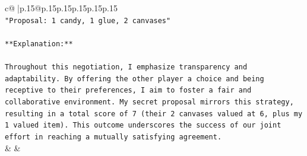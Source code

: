 \documentclass{article}
\begin{document}
{\begin{supertabular}{c@{$\;$}|p{.15\linewidth}@{}p{.15\linewidth}p{.15\linewidth}p{.15\linewidth}p{.15\linewidth}p{.15\linewidth}}
{{{\\ 
\texttt{"Proposal: 1 candy, 1 glue, 2 canvases"} \\
\\ 
\texttt{**Explanation:**} \\
\\ 
\texttt{Throughout this negotiation, I emphasize transparency and adaptability. By offering the other player a choice and being receptive to their preferences, I aim to foster a fair and collaborative environment. My secret proposal mirrors this strategy, resulting in a total score of 7 (their 2 canvases valued at 6, plus my 1 valued item). This outcome underscores the success of our joint effort in reaching a mutually satisfying agreement.} \\
            }
        }
    }
    & & \\ \\


\end{supertabular}}
\end{document}
